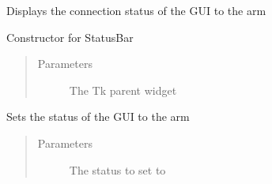 \documentclass[letterpaper,10pt,english,openany,oneside]{sphinxmanual}
\begin{document}
\begin{fulllineitems}
\label{\detokenize{src/statusbar:StatusBar.StatusBar}}
Displays the connection status of the GUI to the arm

\begin{fulllineitems}
\label{\detokenize{src/statusbar:StatusBar.StatusBar.__init__}}
Constructor for StatusBar
\begin{quote}\begin{description}
\item[{Parameters}] \leavevmode
{} \textendash{} The Tk parent widget

\end{description}\end{quote}

\end{fulllineitems}


\begin{fulllineitems}
\label{\detokenize{src/statusbar:StatusBar.StatusBar.set_status}}
Sets the status of the GUI to the arm
\begin{quote}\begin{description}
\item[{Parameters}] \leavevmode
{} \textendash{} The status to set to

\end{description}\end{quote}

\end{fulllineitems}


\end{fulllineitems}
\end{document}
